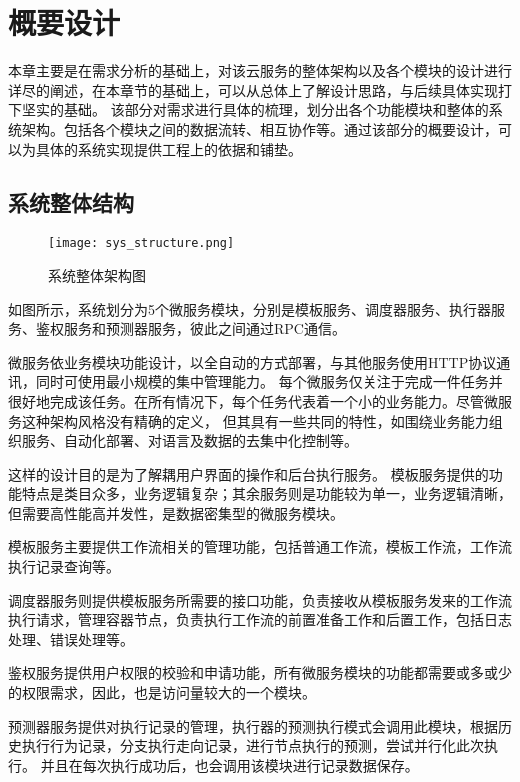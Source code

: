 
\chapter{概要设计}
本章主要是在需求分析的基础上，对该云服务的整体架构以及各个模块的设计进行详尽的阐述，在本章节的基础上，可以从总体上了解设计思路，与后续具体实现打下坚实的基础。
该部分对需求进行具体的梳理，划分出各个功能模块和整体的系统架构。包括各个模块之间的数据流转、相互协作等。通过该部分的概要设计，可以为具体的系统实现提供工程上的依据和铺垫。


\section{系统整体结构}

\begin{figure}[H]
    \centering
    \texttt{[image: sys\_structure.png]}
    \caption{系统整体架构图}
    \label{fig:系统整体架构图}
    \note{}
\end{figure}



如图所示，系统划分为5个微服务模块，分别是模板服务、调度器服务、执行器服务、鉴权服务和预测器服务，彼此之间通过RPC通信。

微服务依业务模块功能设计，以全自动的方式部署，与其他服务使用HTTP协议通讯，同时可使用最小规模的集中管理能力。\cite{jywfbpxt}
每个微服务仅关注于完成一件任务并很好地完成该任务。在所有情况下，每个任务代表着一个小的业务能力。尽管微服务这种架构风格没有精确的定义，
但其具有一些共同的特性，如围绕业务能力组织服务、自动化部署、对语言及数据的去集中化控制等。\cite{wlfwyh}

这样的设计目的是为了解耦用户界面的操作和后台执行服务。
模板服务提供的功能特点是类目众多，业务逻辑复杂；其余服务则是功能较为单一，业务逻辑清晰，但需要高性能高并发性，是数据密集型的微服务模块。

模板服务主要提供工作流相关的管理功能，包括普通工作流，模板工作流，工作流执行记录查询等。

调度器服务则提供模板服务所需要的接口功能，负责接收从模板服务发来的工作流执行请求，管理容器节点，负责执行工作流的前置准备工作和后置工作，包括日志处理、错误处理等。

鉴权服务提供用户权限的校验和申请功能，所有微服务模块的功能都需要或多或少的权限需求，因此，也是访问量较大的一个模块。

预测器服务提供对执行记录的管理，执行器的预测执行模式会调用此模块，根据历史执行行为记录，分支执行走向记录，进行节点执行的预测，尝试并行化此次执行。
并且在每次执行成功后，也会调用该模块进行记录数据保存。



